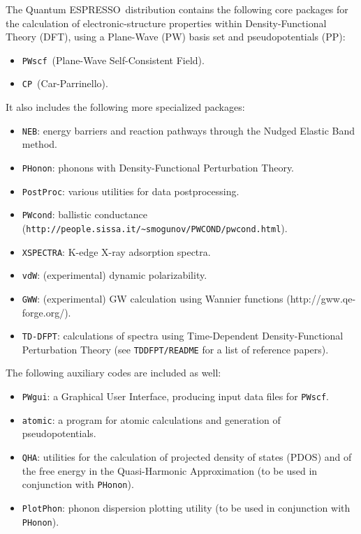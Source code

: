 \documentclass[12pt,a4paper]{article}
\def\qe{{\sc Quantum ESPRESSO}}
\def\PWscf{\texttt{PWscf}}
\def\PHonon{\texttt{PHonon}}
\def\CP{\texttt{CP}}
\def\PostProc{\texttt{PostProc}}
\begin{document}
The \qe\ distribution contains the following core packages 
for the calculation of electronic-structure properties within
Density-Functional Theory (DFT), using a Plane-Wave (PW) basis set 
and pseudopotentials (PP):
\begin{itemize}
  \item \PWscf\ (Plane-Wave Self-Consistent Field).
  \item \CP\ (Car-Parrinello).
\end{itemize}
It also includes the following more specialized packages:
\begin{itemize}
  \item \texttt{NEB}:
        energy barriers and reaction pathways through the Nudged Elastic Band method.
  \item \PHonon:
        phonons with Density-Functional Perturbation Theory.
  \item \PostProc: various utilities for data postprocessing.
  \item \texttt{PWcond}:
        ballistic conductance (\texttt{http://people.sissa.it/\~{}smogunov/PWCOND/pwcond.html}).
  \item \texttt{XSPECTRA}:
        K-edge X-ray adsorption spectra.
  \item \texttt{vdW}:
        (experimental) dynamic polarizability. 
  \item \texttt{GWW}:
        (experimental) GW calculation using Wannier functions
        (http://gww.qe-forge.org/).
  \item \texttt{TD-DFPT}:
        calculations of spectra using Time-Dependent 
        Density-Functional Perturbation Theory (see \texttt{TDDFPT/README} for a list of reference papers).
\end{itemize}
The following auxiliary codes are included as well:
\begin{itemize}
\item \texttt{PWgui}:
      a Graphical User Interface, producing input data files for 
      \PWscf.
\item \texttt{atomic}:
      a program for atomic calculations and generation of pseudopotentials.
\item \texttt{QHA}:
      utilities for the calculation of projected density of states (PDOS)
      and of the free energy in the Quasi-Harmonic Approximation (to be
      used in conjunction with \PHonon).
\item \texttt{PlotPhon}:
      phonon dispersion plotting utility (to be
      used in conjunction with \PHonon).
\end{itemize}
\end{document}

